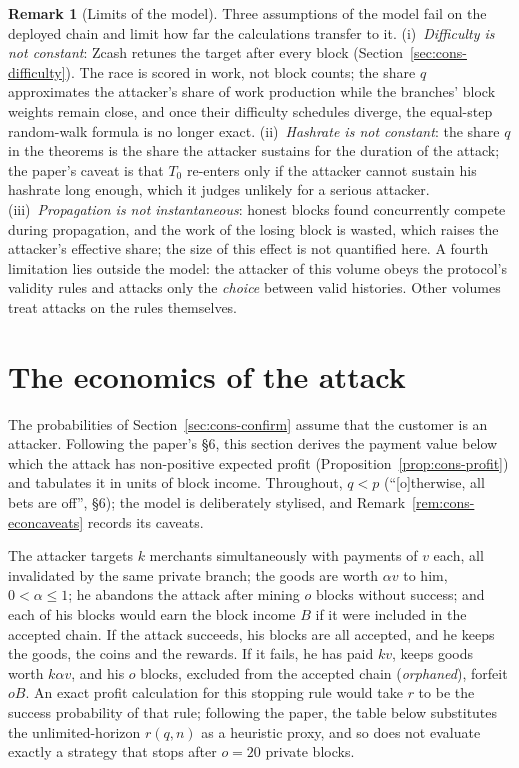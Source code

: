 \documentclass[11pt,a4paper]{article}
\theoremstyle{definition}
\newtheorem{remark}[theorem]{Remark}
\begin{document}
\begin{remark}[Limits of the model]\label{rem:cons-modellimits}
Three assumptions of the model fail on the deployed chain and limit how
far the calculations transfer to it.
(i)~\emph{Difficulty is not constant}: Zcash retunes the target after
every block (Section~\ref{sec:cons-difficulty}). The race is scored in
work, not block counts; the share $q$ approximates the attacker's share of
work production while the branches' block weights remain close, and once
their difficulty schedules diverge, the equal-step random-walk formula is
no longer exact.
(ii)~\emph{Hashrate is not constant}: the share $q$ in the theorems is the
share the attacker sustains for the duration of the attack; the paper's
caveat is that $T_0$ re-enters only if the attacker cannot sustain his
hashrate long enough, which it judges unlikely for a serious attacker.
(iii)~\emph{Propagation is not instantaneous}: honest blocks found
concurrently compete during propagation, and the work of the losing block is
wasted, which raises the attacker's effective share; the size of this effect
is not quantified here. A fourth limitation
lies outside the model: the attacker of this volume obeys the protocol's
validity rules and attacks only the \emph{choice} between valid
histories. Other volumes treat attacks on the rules themselves.
\end{remark}

\section{The economics of the attack}\label{sec:cons-econ}

The probabilities of Section~\ref{sec:cons-confirm} assume that the
customer is an attacker. Following the paper's \S6, this section derives
the payment value below which the attack has non-positive expected profit
(Proposition~\ref{prop:cons-profit}) and tabulates it in units of block
income. Throughout, $q < p$ (``[o]therwise, all bets are off'', \S6); the
model is deliberately stylised, and Remark~\ref{rem:cons-econcaveats} records
its caveats.

The attacker targets $k$ merchants simultaneously with payments of $v$
each, all invalidated by the same private branch; the goods are worth
$\alpha v$ to him, $0 < \alpha \leq 1$; he abandons the attack after
mining $o$ blocks without success; and each of his blocks would earn
the block income $B$ if it were included in the accepted chain. If the
attack succeeds, his blocks are all accepted, and he keeps the goods, the
coins and the rewards. If it fails, he has paid $kv$, keeps goods worth
$k \alpha v$, and his $o$ blocks, excluded from the accepted chain
(\emph{orphaned}), forfeit $oB$. An exact profit calculation for this
stopping rule would take $r$ to be the success probability of that rule;
following the paper, the table below substitutes the unlimited-horizon
$r(q,n)$ as a heuristic proxy, and so does not evaluate exactly a strategy
that stops after $o=20$ private blocks.
\end{document}
